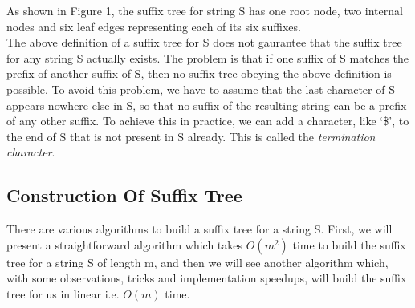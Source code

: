 \documentclass[11pt,a4paper]{article}
\begin{document}
As shown in Figure 1, the suffix tree for string S has one root node, two internal nodes and six leaf edges representing each of its six suffixes.
\\
The above definition of a suffix tree for S does not gaurantee that the suffix tree for any string S actually exists. The problem is that if one suffix of S matches the prefix of another suffix of S, then no suffix tree obeying the above definition is possible. To avoid this problem, we have to assume that the last character of S appears nowhere else in S, so that no suffix of the resulting string can be a prefix of any other suffix. To achieve this in practice, we can add a character, like `\$', to the end of S that is not present in S already. This is called the \emph{termination character}. 

\subsection{Construction Of Suffix Tree}
There are various algorithms to build a suffix tree for a string S. First, we will present a straightforward algorithm which takes \begin{math}O(m^2)\end{math} time to build the suffix tree for a string S of length m, and then we will see another algorithm which, with some observations, tricks and implementation speedups, will build the suffix tree for us in linear i.e. \begin{math}O(m)\end{math} time.
\end{document}
